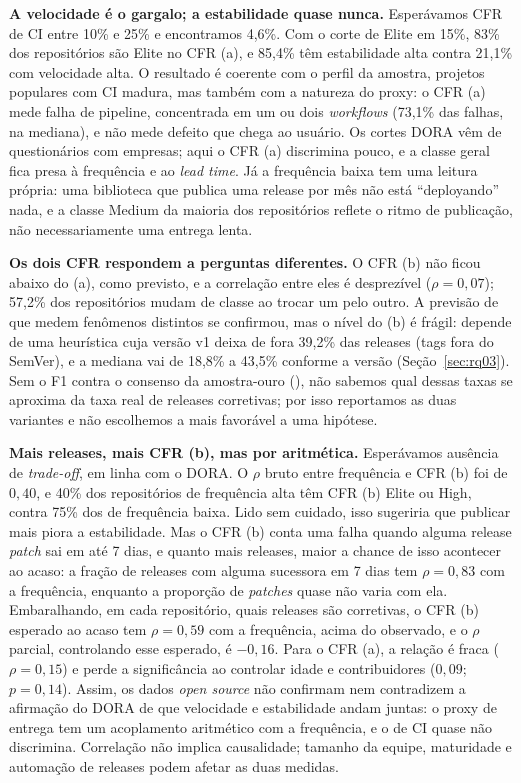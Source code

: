 \textbf{A velocidade é o gargalo; a estabilidade quase nunca.} Esperávamos CFR de CI entre 10\% e
25\% e encontramos 4,6\%. Com o corte de Elite em 15\%, 83\% dos repositórios são Elite no CFR (a),
e 85,4\% têm estabilidade alta contra 21,1\% com velocidade alta. O resultado é coerente com o
perfil da amostra, projetos populares com CI madura, mas também com a natureza do proxy: o CFR (a)
mede falha de pipeline, concentrada em um ou dois \textit{workflows} (73,1\% das falhas, na mediana),
e não mede defeito que chega ao usuário. Os cortes DORA vêm de questionários com empresas; aqui o
CFR (a) discrimina pouco, e a classe geral fica presa à frequência e ao \textit{lead time}. Já a
frequência baixa tem uma leitura própria: uma biblioteca que publica uma release por mês não está
``deployando'' nada, e a classe Medium da maioria dos repositórios reflete o ritmo de publicação,
não necessariamente uma entrega lenta.

\textbf{Os dois CFR respondem a perguntas diferentes.} O CFR (b) não ficou abaixo do (a), como
previsto, e a correlação entre eles é desprezível ($\rho = 0{,}07$); 57,2\% dos repositórios mudam de
classe ao trocar um pelo outro. A previsão de que medem fenômenos distintos se confirmou, mas o
nível do (b) é frágil: depende de uma heurística cuja versão v1 deixa de fora 39,2\% das releases
(tags fora do SemVer), e a mediana vai de 18,8\% a 43,5\% conforme a versão
(Seção~\ref{sec:rq03}). Sem o F1 contra o consenso da amostra-ouro (), não sabemos qual dessas taxas se aproxima da
taxa real de releases corretivas; por isso reportamos as duas variantes e não escolhemos a mais
favorável a uma hipótese.

\textbf{Mais releases, mais CFR (b), mas por aritmética.} Esperávamos ausência de \textit{trade-off}, em
linha com o DORA. O $\rho$ bruto entre frequência e CFR (b) foi de $0{,}40$, e 40\% dos repositórios de
frequência alta têm CFR (b) Elite ou High, contra 75\% dos de frequência baixa. Lido sem cuidado, isso
sugeriria que publicar mais piora a estabilidade. Mas o CFR (b) conta uma falha quando alguma release
\textit{patch} sai em até 7 dias, e quanto mais releases, maior a chance de isso acontecer ao acaso: a fração
de releases com alguma sucessora em 7 dias tem $\rho = 0{,}83$ com a frequência, enquanto a proporção de
\textit{patches} quase não varia com ela. Embaralhando, em cada repositório, quais releases são corretivas,
o CFR (b) esperado ao acaso tem $\rho = 0{,}59$ com a frequência, acima do observado, e o $\rho$ parcial,
controlando esse esperado, é $-0{,}16$. Para o CFR (a), a relação é fraca ($\rho = 0{,}15$) e perde a
significância ao controlar idade e contribuidores ($0{,}09$; $p = 0{,}14$). Assim, os dados
\textit{open source} não confirmam nem contradizem a afirmação do DORA de que velocidade e estabilidade
andam juntas: o proxy de entrega tem um acoplamento aritmético com a frequência, e o de CI quase não
discrimina. Correlação não implica causalidade; tamanho da equipe, maturidade e automação de
releases podem afetar as duas medidas.


